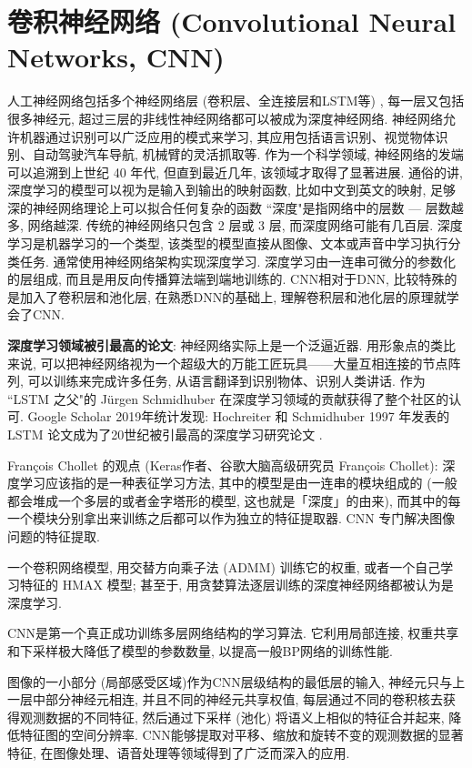 \section{卷积神经网络 (Convolutional Neural Networks, CNN)}
人工神经网络包括多个神经网络层 (卷积层、全连接层和LSTM等) , 每一层又包括很多神经元, 超过三层的非线性神经网络都可以被成为深度神经网络.
神经网络允许机器通过识别可以广泛应用的模式来学习, 其应用包括语言识别、视觉物体识别、自动驾驶汽车导航, 机械臂的灵活抓取等.
作为一个科学领域, 神经网络的发端可以追溯到上世纪 40 年代, 但直到最近几年, 该领域才取得了显著进展.
通俗的讲, 深度学习的模型可以视为是输入到输出的映射函数, 比如中文到英文的映射, 足够深的神经网络理论上可以拟合任何复杂的函数
 ``深度"是指网络中的层数 — 层数越多, 网络越深. 传统的神经网络只包含 2 层或 3 层, 而深度网络可能有几百层.
深度学习是机器学习的一个类型, 该类型的模型直接从图像、文本或声音中学习执行分类任务. 通常使用神经网络架构实现深度学习.
深度学习由一连串可微分的参数化的层组成, 而且是用反向传播算法端到端地训练的.
CNN相对于DNN, 比较特殊的是加入了卷积层和池化层, 在熟悉DNN的基础上, 理解卷积层和池化层的原理就学会了CNN.
\begin{remark}
\textbf{深度学习领域被引最高的论文}:
神经网络实际上是一个泛逼近器. 用形象点的类比来说, 可以把神经网络视为一个超级大的万能工匠玩具——大量互相连接的节点阵列, 可以训练来完成许多任务, 从语言翻译到识别物体、识别人类讲话.
作为 ``LSTM 之父"的 Jürgen Schmidhuber 在深度学习领域的贡献获得了整个社区的认可.
Google Scholar 2019年统计发现: Hochreiter 和 Schmidhuber 1997 年发表的 LSTM 论文成为了20世纪被引最高的深度学习研究论文 \cite{HochreiterNC1997}.
\end{remark}

François Chollet 的观点 (Keras作者、谷歌大脑高级研究员 François Chollet):
深度学习应该指的是一种表征学习方法, 其中的模型是由一连串的模块组成的 (一般都会堆成一个多层的或者金字塔形的模型, 这也就是「深度」的由来),
而其中的每一个模块分别拿出来训练之后都可以作为独立的特征提取器.
CNN 专门解决图像问题的特征提取.
\begin{remark}
    一个卷积网络模型, 用交替方向乘子法 (ADMM) 训练它的权重, 或者一个自己学习特征的 HMAX 模型;
    甚至于, 用贪婪算法逐层训练的深度神经网络都被认为是深度学习.
\end{remark}

\begin{remark}
    CNN是第一个真正成功训练多层网络结构的学习算法. 它利用局部连接, 权重共享和下采样极大降低了模型的参数数量, 以提高一般BP网络的训练性能.
\end{remark}

图像的一小部分 (局部感受区域)作为CNN层级结构的最低层的输入, 神经元只与上一层中部分神经元相连, 并且不同的神经元共享权值,
每层通过不同的卷积核去获得观测数据的不同特征, 然后通过下采样 (池化) 将语义上相似的特征合并起来, 降低特征图的空间分辨率.
CNN能够提取对平移、缩放和旋转不变的观测数据的显著特征, 在图像处理、语音处理等领域得到了广泛而深入的应用.
